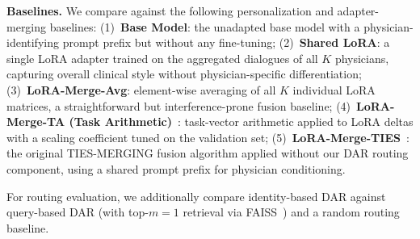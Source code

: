 \textbf{Baselines.}
We compare against the following personalization and adapter-merging baselines:
(1)~\textbf{Base Model}: the unadapted base model with a physician-identifying prompt prefix but without any fine-tuning;
(2)~\textbf{Shared LoRA}: a single LoRA adapter trained on the aggregated dialogues of all $K$ physicians, capturing overall clinical style without physician-specific differentiation;
(3)~\textbf{LoRA-Merge-Avg}: element-wise averaging of all $K$ individual LoRA matrices, a straightforward but interference-prone fusion baseline;
(4)~\textbf{LoRA-Merge-TA (Task Arithmetic)}~\cite{ilharco2023editing}: task-vector arithmetic applied to LoRA deltas with a scaling coefficient tuned on the validation set;
(5)~\textbf{LoRA-Merge-TIES}~\cite{yadavTIESMergingResolvingInterference2023a}: the original TIES-MERGING fusion algorithm applied without our DAR routing component, using a shared prompt prefix for physician conditioning.

For routing evaluation, we additionally compare identity-based DAR against query-based DAR (with top-$m=1$ retrieval via FAISS~\cite{johnson2019faiss}) and a random routing baseline.



